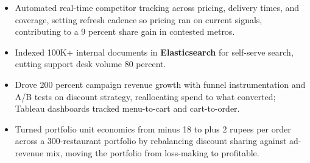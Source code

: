 \documentclass[letterpaper,10pt]{article}
\begin{document}
\begin{itemize}
\item Automated real-time competitor tracking across pricing, delivery times, and coverage, setting refresh cadence so pricing ran on current signals, contributing to a 9 percent share gain in contested metros.
\item Indexed 100K+ internal documents in \textbf{Elasticsearch} for self-serve search, cutting support desk volume 80 percent.
\item Drove 200 percent campaign revenue growth with funnel instrumentation and A/B tests on discount strategy, reallocating spend to what converted; Tableau dashboards tracked menu-to-cart and cart-to-order.
\item Turned portfolio unit economics from minus 18 to plus 2 rupees per order across a 300-restaurant portfolio by rebalancing discount sharing against ad-revenue mix, moving the portfolio from loss-making to profitable.
\end{itemize}
\end{document}
